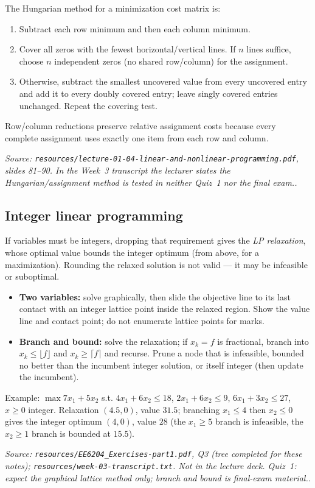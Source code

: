 \documentclass[11pt,a4paper]{article}
\renewcommand{\texttt}[1]{\nolinkurl{#1}}
\newcommand{\source}[1]{\par\smallskip\noindent\textit{Source: #1.}\par\smallskip}
\begin{document}
The Hungarian method for a minimization cost matrix is:
\begin{enumerate}
 \item Subtract each row minimum and then each column minimum.
 \item Cover all zeros with the fewest horizontal/vertical lines. If $n$ lines suffice, choose $n$ independent zeros (no shared row/column) for the assignment.
 \item Otherwise, subtract the smallest uncovered value from every uncovered entry and add it to every doubly covered entry; leave singly covered entries unchanged. Repeat the covering test.
\end{enumerate}
Row/column reductions preserve relative assignment costs because every complete assignment uses exactly one item from each row and column.
\source{\texttt{resources/lecture-01-04-linear-and-nonlinear-programming.pdf}, slides 81--90. In the Week~3 transcript the lecturer states the Hungarian/assignment method is tested in \emph{neither} Quiz~1 nor the final exam.}

\subsection{Integer linear programming}
If variables must be integers, dropping that requirement gives the \emph{LP relaxation}, whose optimal value bounds the integer optimum (from above, for a maximization). Rounding the relaxed solution is not valid --- it may be infeasible or suboptimal.
\begin{itemize}
 \item \textbf{Two variables:} solve graphically, then slide the objective line to its last contact with an integer lattice point inside the relaxed region. Show the value line and contact point; do not enumerate lattice points for marks.
 \item \textbf{Branch and bound:} solve the relaxation; if $x_k=f$ is fractional, branch into $x_k\leq\lfloor f\rfloor$ and $x_k\geq\lceil f\rceil$ and recurse. Prune a node that is infeasible, bounded no better than the incumbent integer solution, or itself integer (then update the incumbent).
\end{itemize}
Example: $\max 7x_1+5x_2$ s.t. $4x_1+6x_2\leq18$, $2x_1+6x_2\leq9$, $6x_1+3x_2\leq27$, $x\geq0$ integer. Relaxation $(4.5,0)$, value $31.5$; branching $x_1\leq4$ then $x_2\leq0$ gives the integer optimum $(4,0)$, value $28$ (the $x_1\geq5$ branch is infeasible, the $x_2\geq1$ branch is bounded at $15.5$).
\source{\texttt{resources/EE6204\_Exercises-part1.pdf}, Q3 (tree completed for these notes); \texttt{resources/week-03-transcript.txt}. Not in the lecture deck. Quiz~1: expect the graphical lattice method only; branch and bound is final-exam material.}
\end{document}
